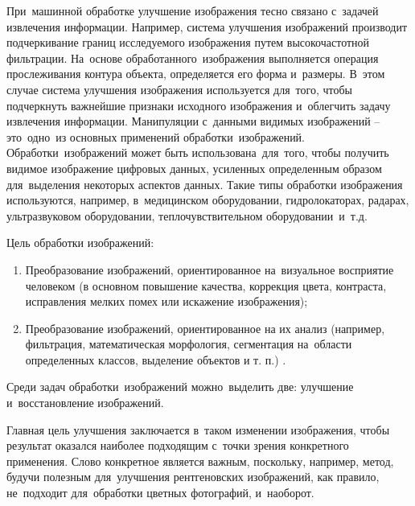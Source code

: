 \documentclass{ou}
\begin{document}
При~машинной обработке улучшение изображения тесно связано с~задачей извлечения информации. Например, система улучшения изображений производит подчеркивание границ исследуемого изображения путем высокочастотной фильтрации. На~основе обработанного~изображения выполняется операция прослеживания контура объекта, определяется его форма и~размеры. В~этом случае система улучшения изображения используется для~того, чтобы подчеркнуть важнейшие признаки исходного изображения и~облегчить задачу извлечения информации. Манипуляции с~данными видимых изображений -- это~одно~из основных применений обработки~изображений. Обработки~изображений может быть использована~для~того, чтобы получить видимое изображение цифровых данных, усиленных определенным образом для~выделения некоторых аспектов данных. Такие типы обработки изображения используются, например, в~медицинском оборудовании, гидролокаторах, радарах, ультразвуковом оборудовании, теплочувствительном оборудовании~и~т.д.

Цель обработки изображений:
\begin{enumerate}[leftmargin=0em, itemindent=3.75em, nosep, label=\arabic*)]
\item Преобразование изображений, ориентированное на~визуальное восприятие человеком (в основном повышение качества, коррекция цвета, контраста, исправления мелких помех или искажение изображения);
\item Преобразование изображений, ориентированное на их анализ (например, фильтрация, математическая морфология, сегментация на~области определенных классов, выделение объектов и т. п.) \cite{Modern_Research_and_Innovations}.
\end{enumerate}

Среди задач обработки~изображений можно~выделить две: улучшение и~восстановление изображений.

Главная цель улучшения заключается в~таком изменении изображения, чтобы результат оказался наиболее подходящим с~точки зрения конкретного применения. Слово конкретное является важным, поскольку, например, метод, будучи полезным для~улучшения рентгеновских изображений, как правило, не~подходит для~обработки цветных фотографий, и~наоборот.
\end{document}
